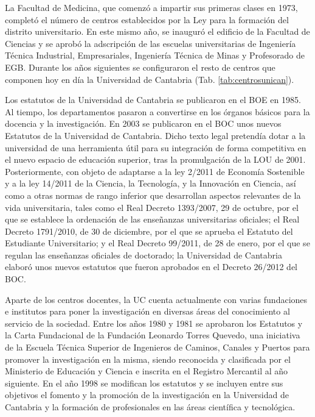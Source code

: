 La Facultad de Medicina, que comenzó a impartir sus primeras clases en 1973, completó el número de centros establecidos por la Ley para la formación del distrito universitario.  En este mismo año, se inauguró el edificio de la Facultad de Ciencias y se aprobó la adscripción de las escuelas universitarias de Ingeniería Técnica Industrial, Empresariales, Ingeniería Técnica de Minas y Profesorado de EGB.  Durante los años siguientes se configuraron el resto de centros que componen hoy en día la Universidad de Cantabria (Tab. \ref{tab:centrosunican}).
 
Los estatutos de la Universidad de Cantabria se publicaron en el BOE en 1985. Al tiempo, los departamentos pasaron a convertirse en los órganos básicos para la docencia y la investigación. En 2003 se publicaron en el BOC unos nuevos Estatutos de la Universidad de Cantabria. Dicho texto legal pretendía dotar a la universidad de una herramienta útil para su integración de forma competitiva en el nuevo espacio de educación superior, tras la promulgación de la LOU de 2001. Posteriormente, con objeto de adaptarse a la ley 2/2011 de Economía Sostenible y a la ley 14/2011 de la Ciencia, la Tecnología, y la Innovación en Ciencia, así como a otras normas de rango inferior que desarrollan aspectos relevantes de la vida universitaria, tales como el Real Decreto 1393/2007, 29 de octubre, por el que se establece la ordenación de las enseñanzas universitarias oficiales; el Real Decreto 1791/2010, de 30 de diciembre,
por el que se aprueba el Estatuto del Estudiante Universitario; y el Real Decreto 99/2011, de 28 de enero, por el que se regulan las enseñanzas oficiales de doctorado; la Universidad de Cantabria elaboró unos nuevos estatutos que fueron aprobados en el Decreto 26/2012 del BOC.  
 
Aparte de los centros docentes, la UC cuenta actualmente con varias fundaciones e institutos para poner la investigación en diversas áreas del conocimiento al servicio de la sociedad. Entre los años 1980 y 1981 se aprobaron los Estatutos y la Carta Fundacional de la Fundación Leonardo Torres Quevedo, una iniciativa de la Escuela Técnica Superior de Ingenieros de Caminos, Canales y Puertos para promover la investigación en la misma, siendo reconocida y clasificada por el Ministerio de Educación y Ciencia e inscrita en el Registro Mercantil al año siguiente. En el año 1998 se modifican los estatutos y se incluyen entre sus objetivos el fomento y la promoción de la investigación en la Universidad de Cantabria y la formación de profesionales en las áreas científica y tecnológica.

